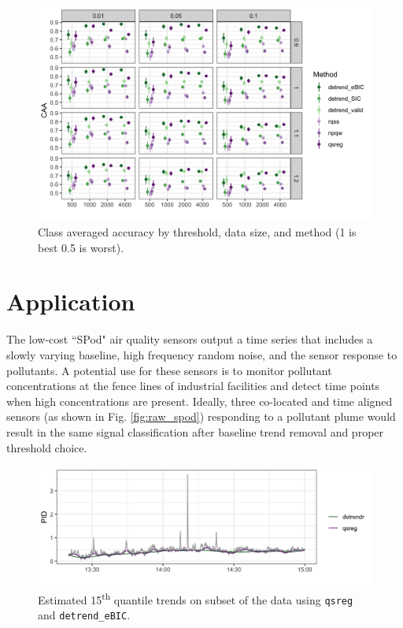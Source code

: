 \documentclass[12pt]{article}
\begin{document}
	\begin{figure}[h!]
		\includegraphics[width = \linewidth]{Figures/peaks_CAA.png}
		\caption{Class averaged accuracy by threshold, data size, and method (1 is best 0.5 is worst).}
	\end{figure}


	\FloatBarrier
	
	\section{Application}
	\label{sec:application}
	The low-cost ``SPod" air quality sensors output a time series that includes a slowly varying baseline, high frequency random noise, and the sensor response to pollutants. A potential use for these sensors is to monitor pollutant concentrations at the fence lines of industrial facilities and detect time points when high concentrations are present. Ideally, three co-located and time aligned sensors (as shown in Fig. \ref{fig:raw_spod}) responding to a pollutant plume would result in the same signal classification after baseline trend removal and proper threshold choice. 
	
	\begin{figure}
		\includegraphics[width = \linewidth]{Figures/short_trends.png}
		\caption{Estimated 15\textsuperscript{th} quantile trends on subset of the data using \texttt{qsreg} and \texttt{detrend\_eBIC}.} 
		\label{fig:short-trends}
	\end{figure}
\end{document}
